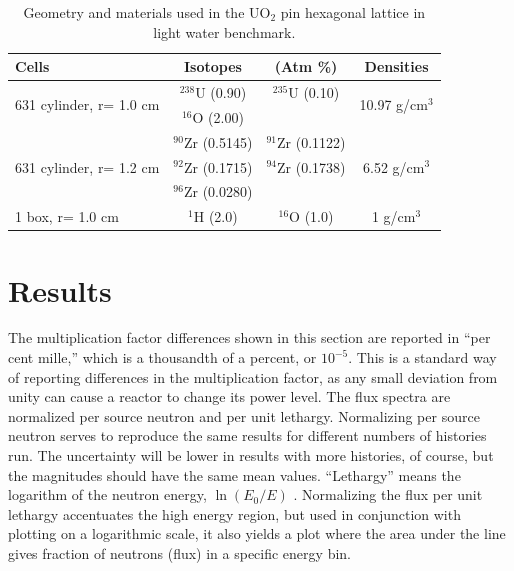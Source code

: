 \documentclass[preprint,12pt]{elsarticle}
\begin{document}
\begin{table}[h]
\centering
\caption{Geometry and materials used in the UO$_2$ pin hexagonal lattice in light water benchmark.}
\label{hex_geom}
\begin{tabular}{| l | c  c | c |}
\hline
Cells & Isotopes & (Atm \%) & Densities \\
\hline
\multirow{2}{*}{631 cylinder, r= 1.0 cm }  &   $^{238}$U   (0.90)   &    $^{235}$U   (0.10)  &  \multirow{2}{*}{10.97 g/cm$^3$} \\
                                           &   $^{16}$O    (2.00)   &                        &  \\
\hline
\multirow{3}{*}{631 cylinder, r= 1.2 cm }  &   $^{90}$Zr   (0.5145) &    $^{91}$Zr   (0.1122)&  \multirow{3}{*}{6.52 g/cm$^3$} \\
                                           &   $^{92}$Zr   (0.1715) &    $^{94}$Zr   (0.1738)& \\
                                           &   $^{96}$Zr   (0.0280) &                        & \\
\hline
\multirow{1}{*}{1 box, r= 1.0 cm }         &   $^{1}$H     (2.0)    &   $^{16}$O  (1.0) & \multirow{1}{*}{1 g/cm$^3$} \\
\hline
\end{tabular}
\end{table}




\newpage
\section{Results}
\label{sec:results}

The multiplication factor differences shown in this section are reported in ``per cent mille,'' which is a thousandth of a percent, or $10^{-5}$.  This is a standard way of reporting differences in the multiplication factor, as any small deviation from unity can cause a reactor to change its power level.  The flux spectra are normalized per source neutron and per unit lethargy.  Normalizing per source neutron serves to reproduce the same results for different numbers of histories run.  The uncertainty will be lower in results with more histories, of course, but the magnitudes should have the same mean values.   ``Lethargy'' means the logarithm of the neutron energy, $\ln(E_0/E)$ \cite{duderstadt}.  Normalizing the flux per unit lethargy accentuates the high energy region, but used in conjunction with plotting on a logarithmic scale, it also yields a plot where the area under the line gives fraction of neutrons (flux) in a specific energy bin.  
\end{document}
